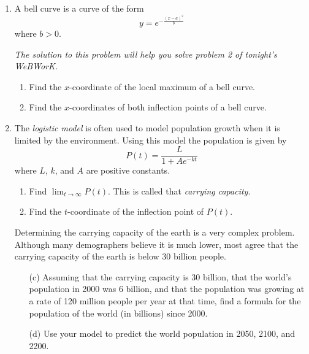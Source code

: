 \documentclass[11pt]{article}
\begin{document}
\drawtitle
\begin{enumerate}
\item A bell curve is a curve of the form
  \[
  y=e^{-\frac{(x-a)^2}{b}}
  \]
  where $b>0$.

  \textit{The solution to this problem will help you solve problem 2
    of tonight's WeBWorK.}
  
  \begin{enumerate}
  \item Find the $x$-coordinate of the local maximum of a bell curve.
    \vfill
  \item Find the $x$-coordinates of both inflection points of a bell curve.
    \vfill
  \end{enumerate}

  \newpage

\item The \textit{logistic model} is often used to model population
  growth when it is limited by the environment.  Using this model the population is
  given by
  \[
  P(t) = \frac{L}{1+Ae^{-kt}}
  \]
  where $L$, $k$, and $A$ are positive constants.

  \begin{enumerate}
  \item Find $\displaystyle \lim_{t\to\infty} P(t)$.  This is called
    that \textit{carrying capacity}.
    \vfill
  \item Find the $t$-coordinate of the inflection point of $P(t)$.
    \vfill
  \end{enumerate}
  
  \newpage

  Determining the carrying capacity of the earth is a very complex
  problem.  Although many demographers believe it is much lower, most
  agree that the carrying capacity of the earth is below 30 billion
  people.

  \begin{enumerate}
  \item[(c)] Assuming that the carrying capacity is 30 billion, that the
    world's population in 2000 was 6 billion, and that the population
    was growing at a rate of 120 million people per year at that time,
    find a formula for the population of the world (in billions) since
    2000.

    \vfill\vfill

  \item[(d)] Use your model to predict the world population in 2050, 2100,
    and 2200.

    \vfill


\end{enumerate}
\end{enumerate}
\end{document}
